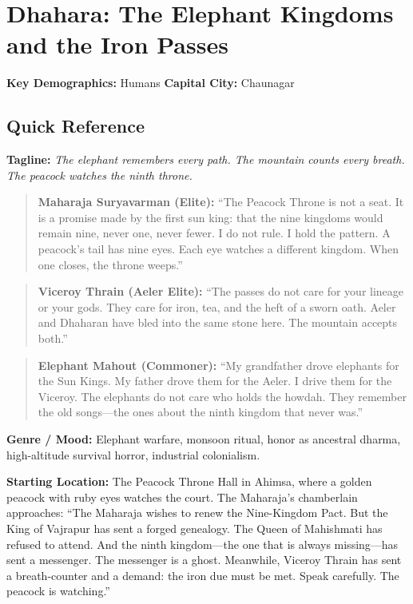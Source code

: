 \section{Dhahara: The Elephant Kingdoms and the Iron Passes}
\label{chap:dhahara}

\textbf{Key Demographics: } Humans
\textbf{Capital City: } Chaunagar

\subsection*{Quick Reference}
\textbf{Tagline:} \textit{The elephant remembers every path. The mountain counts every breath. The peacock watches the ninth throne.}

\begin{quote}
  \textbf{Maharaja Suryavarman (Elite):}  
  ``The Peacock Throne is not a seat. It is a promise made by the first sun king: that the nine kingdoms would remain nine, never one, never fewer. I do not rule. I hold the pattern. A peacock's tail has nine eyes. Each eye watches a different kingdom. When one closes, the throne weeps.''
\end{quote}

\begin{quote}
  \textbf{Viceroy Thrain (Aeler Elite):}  
  ``The passes do not care for your lineage or your gods. They care for iron, tea, and the heft of a sworn oath. Aeler and Dhaharan have bled into the same stone here. The mountain accepts both.''
\end{quote}

\begin{quote}
  \textbf{Elephant Mahout (Commoner):}  
  ``My grandfather drove elephants for the Sun Kings. My father drove them for the Aeler. I drive them for the Viceroy. The elephants do not care who holds the howdah. They remember the old songs---the ones about the ninth kingdom that never was.''
\end{quote}

\textbf{Genre / Mood:} Elephant warfare, monsoon ritual, honor as ancestral dharma, high-altitude survival horror, industrial colonialism.

\textbf{Starting Location:} The Peacock Throne Hall in Ahimsa, where a golden peacock with ruby eyes watches the court. The Maharaja's chamberlain approaches: ``The Maharaja wishes to renew the Nine-Kingdom Pact. But the King of Vajrapur has sent a forged genealogy. The Queen of Mahishmati has refused to attend. And the ninth kingdom---the one that is always missing---has sent a messenger. The messenger is a ghost. Meanwhile, Viceroy Thrain has sent a breath-counter and a demand: the iron due must be met. Speak carefully. The peacock is watching.''

